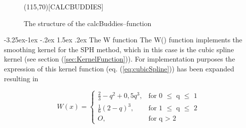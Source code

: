 \documentclass{report}
\makeatletter
\renewcommand\paragraph{\@startsection{paragraph}{4}{\z@}%
  {-3.25ex\@plus -1ex \@minus -.2ex}%
  {1.5ex \@plus .2ex}%
  {\normalfont\normalsize\bfseries}}
\makeatother
\begin{document}
\begin{figure}[H]
\label{fig:CalcBuddies_structure}  

\begin{center}
\begin{struktogramm}(115,70)[CALCBUDDIES]
        \change
        \ifend
      \change
      \ifend
    \whileend
  \whileend
\end{struktogramm}
\end{center}

\caption{The structure of the calcBuddies--function}
\end{figure}


\paragraph{The W function}
The W() function implements the smoothing kernel for the SPH method, which in this case is the cubic spline kernel (see section (\ref{sec:KernelFunction})). For implementation purposes the expression of this kernel function (eq. (\ref{eq:cubicSpline})) has been expanded resulting in

\begin{equation}
\label{eq:cubicSplineImplement}
W(x)=\begin{cases}
\frac{2}{3}-q^{2}+0,5q^{3},& \text{for 0 $\leq$ q $\leq$ 1} \\
\frac{1}{6}(2-q)^{3},&  \text{for 1 $\leq$ q $\leq$ 2} \\
O,& \text{for q $>$ 2}
\end{cases}
\end{equation}
\end{document}
